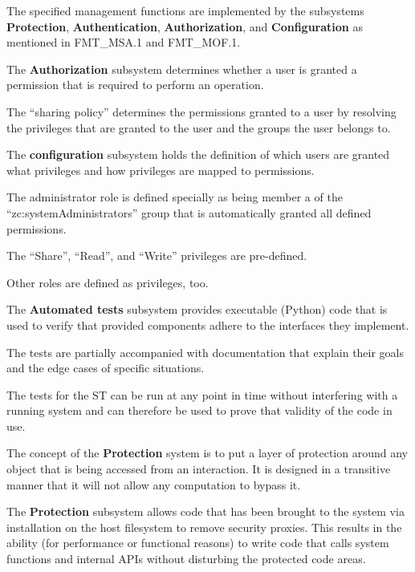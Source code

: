 \documentclass[12pt,english]{scrbook}
\begin{document}

The specified management functions are implemented by the subsystems
\textbf{Protection}, \textbf{Authentication}, \textbf{Authorization}, and
\textbf{Configuration} as mentioned in FMT\_MSA.1 and FMT\_MOF.1.



The \textbf{Authorization} subsystem determines whether a user is granted a
permission that is required to perform an operation.

The ``sharing policy'' determines the permissions granted to a user by
resolving the privileges that are granted to the user and the groups the user
belongs to.

The \textbf{configuration} subsystem holds the definition of which users are granted what
privileges and how privileges are mapped to permissions.

The administrator role is defined specially as being member a of the
``zc:systemAdministrators'' group that is automatically granted all defined
permissions. 

The ``Share'', ``Read'', and ``Write'' privileges are pre-defined.

Other roles are defined as privileges, too.


The \textbf{Automated tests} subsystem provides executable (Python) code that
is used to verify that provided components adhere to the interfaces they
implement.

The tests are partially accompanied with documentation that explain their
goals and the edge cases of specific situations.

The tests for the ST can be run at any point in time without interfering with
a running system and can therefore be used to prove that validity of the code
in use.


The concept of the \textbf{Protection} system is to put a layer of protection
around any object that is being accessed from an interaction. It is designed
in a transitive manner that it will not allow any computation to bypass it.


The \textbf{Protection} subsystem allows code that has been brought to the
system via installation on the host filesystem to remove security proxies. This
results in the ability (for performance or functional reasons) to write code
that calls system functions and internal APIs without disturbing the protected
code areas.
\end{document}

